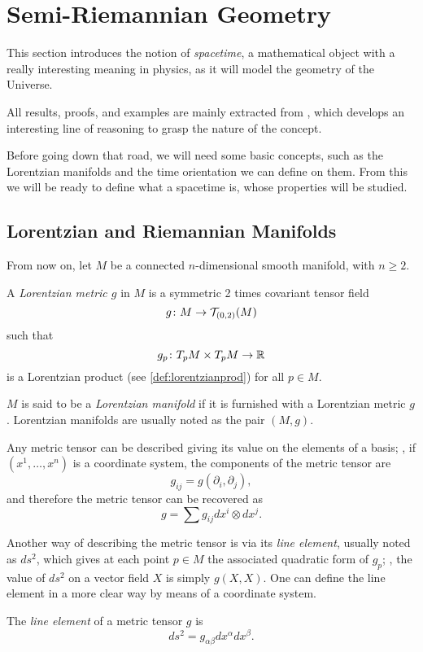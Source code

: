 \chapter{Semi-Riemannian Geometry}
\label{chapter:semiriemannian}

This section introduces the notion of \emph{spacetime}, a mathematical object with a really interesting meaning in physics, as it will model the geometry of the Universe.

All results, proofs, and examples are mainly extracted from \cite{romero10}, which develops an interesting line of reasoning to grasp the nature of the concept.

Before going down that road, we will need some basic concepts, such as the Lorentzian manifolds and the time orientation we can define on them. From this we will be ready to define what a spacetime is, whose properties will be studied.

\section{Lorentzian and Riemannian Manifolds}

From now on, let $M$ be a connected $n$-dimensional smooth manifold, with $n\geq2$.

\begin{definition}
	A \emph{Lorentzian metric $g$} in $M$ is a symmetric 2 times covariant tensor field
	\[
	g \colon M \to {\mathcal T}_{(0,2)}(M)
	\]
	such that
	\[
	g_p \colon T_pM \times T_pM \to \mathbb{R}
	\]
	is a Lorentzian product (see \autoref{def:lorentzianprod}) for all $p \in M$.
\end{definition}

\begin{definition}
	$M$ is said to be a \emph{Lorentzian manifold} if it is furnished with a Lorentzian metric $g$. Lorentzian manifolds are usually noted as the pair $(M,g)$.
\end{definition}

Any metric tensor can be described giving its value on the elements of a basis; \ie, if $(x^1, \dots, x^n)$ is a coordinate system, the components of the metric tensor are
\[
	g_{ij} = g(\partial_i, \partial_j),
\]
and therefore the metric tensor can be recovered as
\[
	g = \sum g_{ij} dx^i \otimes dx^j.
\]

Another way of describing the metric tensor \cite[p. 13]{oneill95} is via its \emph{line element}, usually noted as $ds^2$, which gives at each point $p\in M$ the associated quadratic form of $g_p$; \ie, the value of $ds^2$ on a vector field $X$ is simply $g(X,X)$. One can define the line element in a more clear way by means of a coordinate system.
\begin{definition}
	The \emph{line element} of a metric tensor $g$ is
	\[
		ds^2 = g_{\alpha\beta} dx^\alpha dx^\beta.
	\]
\end{definition}

